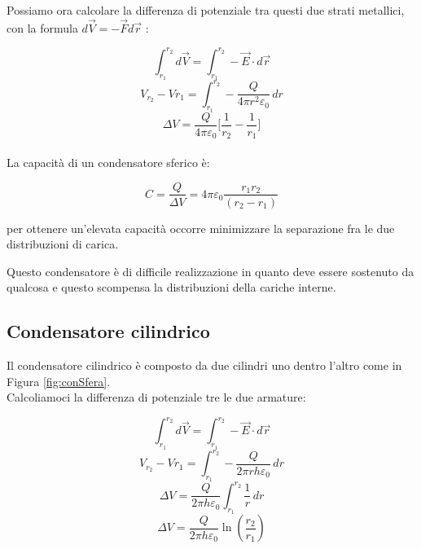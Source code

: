 Possiamo ora calcolare la differenza di potenziale tra questi due strati metallici, con la formula $d\vec{V}  = -\vec{F}d\vec{r}$ :

\begin{equation*}
    \int_{r_1}^{r_2} d\vec{V} = \int_{r_1}^{r_2} - \vec{E}\cdot d\vec{r}
\end{equation*}
\begin{equation*}
    V_{r_2} - V{r_1} = \int_{r_1}^{r_2} - \frac{Q}{4\pi r^2 \varepsilon_0}\,dr
\end{equation*}
\begin{equation}
    \Delta V  = \frac{Q}{4\pi \varepsilon_0}\biggl[\frac{1}{r_2} - \frac{1}{r_1}\biggl]
\end{equation}

\paragraph{}
La capacità di un condensatore sferico è:

\begin{equation}
    C = \frac{Q}{\Delta V} = 4\pi \varepsilon_0\frac{ r_1 r_2 }{(r_2 - r_1)}
\end{equation}

per	ottenere	un’elevata	capacità	occorre	minimizzare	la	
separazione	fra	le	due	distribuzioni	di	carica.

Questo condensatore è di difficile realizzazione in quanto deve essere sostenuto da qualcosa e questo scompensa la distribuzioni della cariche interne.

\subsection{Condensatore cilindrico}
Il condensatore cilindrico è composto da due cilindri uno dentro l'altro come in Figura \ref{fig:conSfera}.
\\
Calcoliamoci la differenza di potenziale tre le due armature:

\begin{equation*}
    \int_{r_1}^{r_2} d\vec{V} = \int_{r_1}^{r_2} - \vec{E}\cdot d\vec{r}
\end{equation*}
\begin{equation*}
    V_{r_2} - V{r_1} = \int_{r_1}^{r_2} - \frac{Q}{2\pi r h \varepsilon_0}\,dr
\end{equation*}
\begin{equation*}
    \Delta V  =  \frac{Q}{2\pi h \varepsilon_0}\int_{r_1}^{r_2} \frac{1}{r}\,dr
\end{equation*}
\begin{equation}
    \Delta V  =  \frac{Q}{2\pi h \varepsilon_0} \ln(\frac{r_2}{r_1})
\end{equation}

